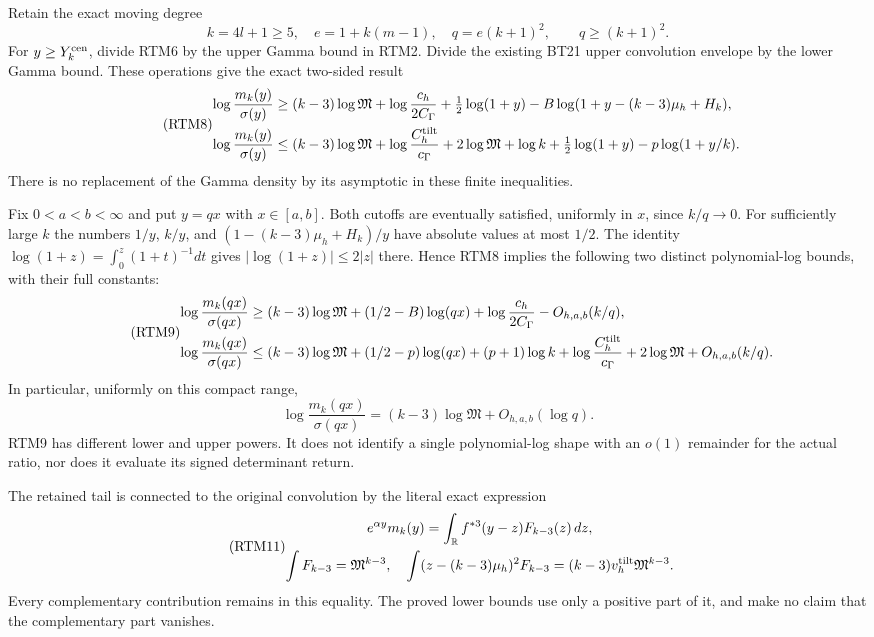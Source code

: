 Retain the exact moving degree
\[
 k=4l+1\ge5,\quad e=1+k(m-1),\quad q=e(k+1)^2,
 \qquad q\ge(k+1)^2.
\]
For $y\ge Y_k^{\rm cen}$, divide RTM6 by the upper Gamma bound in
RTM2.  Divide the existing BT21 upper convolution envelope by the
lower Gamma bound.  These operations give the exact two-sided result
\begin{equation}\tag{RTM8}
 \begin{aligned}
 \log\frac{m_k(y)}{\sigma(y)}\ge{}&(k-3)\log\mathfrak M
 +\log\frac{c_h}{2C_\Gamma}+\tfrac12\log(1+y)
 -B\log(1+y-(k-3)\mu_h+H_k),\\
 \log\frac{m_k(y)}{\sigma(y)}\le{}&(k-3)\log\mathfrak M
 +\log\frac{C_h^{\rm tilt}}{c_\Gamma}+2\log\mathfrak M
 +\log k+\tfrac12\log(1+y)-p\log(1+y/k).
 \end{aligned}
\end{equation}
There is no replacement of the Gamma density by its asymptotic in
these finite inequalities.

Fix $0<a<b<\infty$ and put $y=qx$ with $x\in[a,b]$.
Both cutoffs are eventually satisfied, uniformly in $x$, since
$k/q\to0$.  For sufficiently large $k$ the numbers
$1/y$, $k/y$, and $(1-(k-3)\mu_h+H_k)/y$ have absolute values at
most $1/2$.  The identity
$\log(1+z)=\int_0^z(1+t)^{-1}dt$ gives
$|\log(1+z)|\le2|z|$ there.  Hence RTM8 implies the following
two distinct polynomial-log bounds, with their full constants:
\begin{equation}\tag{RTM9}
 \begin{aligned}
 \log\frac{m_k(qx)}{\sigma(qx)}\ge{}&(k-3)\log\mathfrak M
 +(1/2-B)\log(qx)+\log\frac{c_h}{2C_\Gamma}
 -O_{h,a,b}(k/q),\\
 \log\frac{m_k(qx)}{\sigma(qx)}\le{}&(k-3)\log\mathfrak M
 +(1/2-p)\log(qx)+(p+1)\log k
 +\log\frac{C_h^{\rm tilt}}{c_\Gamma}+2\log\mathfrak M
 +O_{h,a,b}(k/q).
 \end{aligned}
\end{equation}
In particular, uniformly on this compact range,
\begin{equation}\tag{RTM10}
 \log\frac{m_k(qx)}{\sigma(qx)}
 =(k-3)\log\mathfrak M+O_{h,a,b}(\log q).
\end{equation}
RTM9 has different lower and upper powers.  It does not identify a
single polynomial-log shape with an $o(1)$ remainder for the actual
ratio, nor does it evaluate its signed determinant return.

The retained tail is connected to the original convolution by the
literal exact expression
\begin{equation}\tag{RTM11}
\begin{gathered}
 e^{\alpha y}m_k(y)=
 \int_{\mathbb R} f^{*3}(y-z)F_{k-3}(z)\,dz,\\
 \int F_{k-3}=\mathfrak M^{k-3},\quad
 \int(z-(k-3)\mu_h)^2F_{k-3}
 =(k-3)v_h^{\rm tilt}\mathfrak M^{k-3}.
\end{gathered}
\end{equation}
Every complementary contribution remains in this equality.  The
proved lower bounds use only a positive part of it, and make no
claim that the complementary part vanishes.

